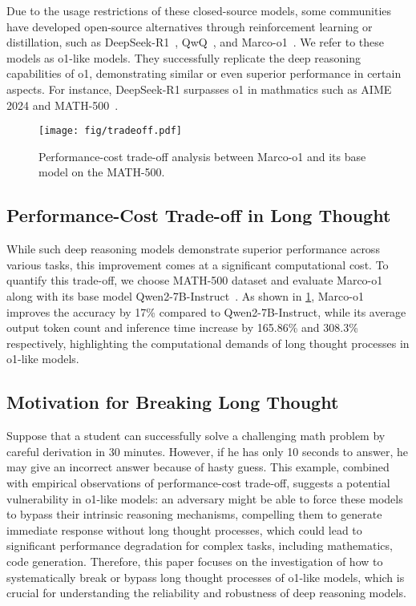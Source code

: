 Due to the usage restrictions of these closed-source models, some communities have developed open-source alternatives through reinforcement learning or distillation, such as DeepSeek-R1~\cite{deepseekr1}, QwQ~\cite{qwq}, and Marco-o1~\cite{zhao2024marco}. 
We refer to these models as o1-like models.  
They successfully replicate the deep reasoning capabilities of o1, demonstrating similar or even superior performance in certain aspects. 
For instance, DeepSeek-R1 surpasses o1 in mathmatics such as AIME 2024 and MATH-500~\cite{deepseekr1}.






\begin{figure}[!t]
    \centering
   \texttt{[image: fig/tradeoff.pdf]}

    \caption{Performance-cost trade-off analysis between Marco-o1 and its base model on the MATH-500.}
    \label{fig:performance_cost_tradeoff}

\end{figure}

\subsection{Performance-Cost Trade-off in Long Thought}
While such deep reasoning models demonstrate superior performance across various tasks, this improvement comes at a significant computational cost. To quantify this trade-off, we choose MATH-500 dataset and evaluate {Marco-o1}~\cite{zhao2024marco} along with its base model {Qwen2-7B-Instruct}~\cite{yang2024qwen25}. As shown in \cref{fig:performance_cost_tradeoff}, {Marco-o1} improves the accuracy by 17\% compared to {Qwen2-7B-Instruct}, while its average output token count and inference time increase by 165.86\% and 308.3\% respectively, highlighting the computational demands of long thought processes in o1-like models.

\subsection{Motivation for Breaking Long Thought}
Suppose that a student can successfully solve a challenging math problem by careful derivation in 30 minutes. However, if he has only 10 seconds to answer, he may give an incorrect answer because of hasty guess.
This example, combined with empirical observations of performance-cost trade-off, suggests a potential vulnerability in o1-like models: an adversary might be able to force these models to bypass their intrinsic reasoning mechanisms, compelling them to generate immediate response without long thought processes, which could lead to significant performance degradation for complex tasks, including mathematics, code generation. 
Therefore, this paper focuses on the investigation of how to systematically break or bypass long thought processes of o1-like models, which is crucial for understanding the reliability and robustness of deep reasoning models.




